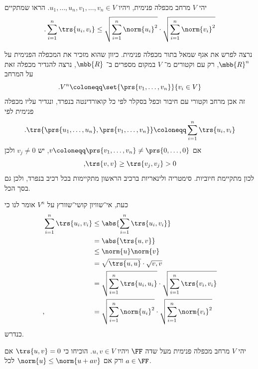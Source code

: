 \documentclass[a4paper,10pt,twoside,openany]{book}
\begin{document}
\begin{exercisechap}
יהי
$V$
מרחב מכפלה פנימית, ויהיו
$u_1, \ldots, u_n, v_1, \ldots, v_n \in V$.
הראו שמתקיים
\begin{align*}
\text{.} \sum_{i = 1}^n \trs{u_i, v_i} \leq \sqrt{{\sum_{i = 1}^n \norm{u_i}^2}} \cdot \sqrt{\sum_{i=1}^n \norm{v_i}^2}
\end{align*}
\end{exercisechap}

\begin{solution}
נרצה לפרש את אגף שמאל בתור מכפלה פנימית.
כיוון שהוא מזכיר את המכפלה הפנימית על
$\mbb{R}^n$,
רק עם וקטורים מ־%
$V$
במקום מספרים ב־%
$\mbb{R}$,
נרצה להגדיר מכפלה זאת על המרחב
\[\text{.} V^n \coloneqq \set{\prs{v_1, \ldots, v_n}}{v_i \in V}\]
זה אכן מרחב וקטורי עם חיבור וכפל בסקלר לפי כל קואורדינטה בנפרד, ונגדיר עליו מכפלה פנימית לפי
\[\text{.} \trs{\prs{u_1, \ldots, u_n}, \prs{v_1, \ldots, v_n}} \coloneqq \sum_{i = 1}^n \trs{u_i, v_i}\]
אם
$v \coloneqq \prs{v_1, \ldots, v_n} \neq \prs{0, \ldots, 0}$,
יש
$v_j \neq 0$
ולכן
\[\text{,} \trs{v,v} \geq \trs{v_j, v_j} > 0\]
לכון מתקיימת חיוביות.
סימטריה ולינאריות ברכיב הראשון מתקיימות בכל רכיב בנפרד, ולכן גם בסך הכל.

כעת, אי־שוויון קושי־שוורץ על
$V^n$
אומר לנו כי
\begin{align*}
\sum_{i = 1}^n \trs{u_i, v_i}
&\leq
\abs{\sum_{i = 1}^n \trs{u_i, v_i}}
\\&=
\abs{\trs{u,v}}
\\&\leq
\norm{u} \norm{v}
\\&=
\sqrt{\trs{u,u}} \cdot \sqrt{v,v}
\\&=
\sqrt{{\sum_{i = 1}^n \trs{u_i, u_i}}} \cdot \sqrt{\sum_{i=1}^n \trs{v_i, v_i}}
\\\text{,}\hphantom{\sum_{i = 1}^n \trs{u_i, v_i}}&=
\sqrt{{\sum_{i = 1}^n \norm{u_i}^2}} \cdot \sqrt{\sum_{i=1}^n \norm{v_i}^2}
\end{align*}
כנדרש.
\end{solution}

\begin{exercisechap}
יהי
$V$
מרחב מכפלה פנימית מעל שדה
$\FF$
ויהיו
$u,v \in V$.
הוכיחו כי
$\trs{u,v} = 0$
אם ורק אם
$\norm{u} \leq \norm{u + a v}$
לכל
$a \in \FF$.
\end{exercisechap}
\end{document}
